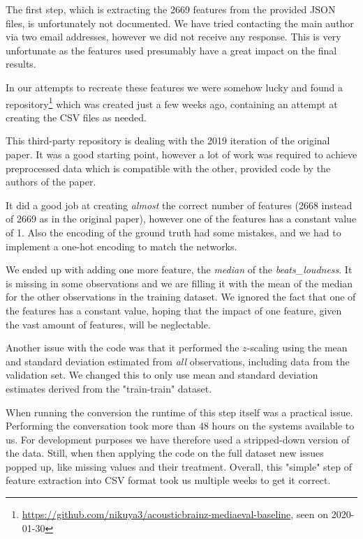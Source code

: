 \documentclass[sigconf,nonacm]{acmart}
\begin{document}
The first step, which is extracting the 2669 features from the provided
JSON files, is unfortunately not documented.
We have tried contacting the main author via two email addresses,
however we did not receive any response.
This is very unfortunate as the features used presumably have a great
impact on the final results.

In our attempts to recreate these features
we were somehow lucky and found a
repository\footnote{\url{https://github.com/nikuya3/acousticbrainz-mediaeval-baseline}, seen on 2020-01-30}
which was created just a few weeks ago, containing an
attempt at creating the CSV files as needed.

This third-party repository is dealing with the 2019 iteration
of the original paper.
It was a good starting point, however a lot of
work was required to achieve preprocessed data which is
compatible with the other, provided code by the authors of the paper.

It did a good job at creating \emph{almost} the correct number
of features (2668 instead of 2669 as in the original paper),
however one of the features has a constant value of 1.
Also the encoding of the ground truth had some mistakes, and we
had to implement a one-hot encoding to match the networks.

We ended up with adding one more feature, the \emph{median}
of the \emph{beats\_loudness}.
It is missing in some observations and we are filling it with the mean
of the median for the other observations in the training dataset.
We ignored the fact that one of the features has a constant value,
hoping that the impact of one feature, given the vast amount of features,
will be neglectable.

Another issue with the code was that it performed the $z$-scaling using
the mean and standard deviation estimated from \emph{all} observations,
including data from the validation set.
We changed this to only use mean and standard deviation estimates
derived from the "train-train" dataset.

When running the conversion the runtime of this step itself was
a practical issue.
Performing the conversation took more than 48 hours on the systems
available to us.
For development purposes we have therefore used a stripped-down
version of the data.
Still, when then applying the code on the full dataset new
issues popped up, like missing values and their treatment.
Overall, this "simple" step of feature extraction into CSV
format took us multiple weeks to get it correct.
\end{document}

